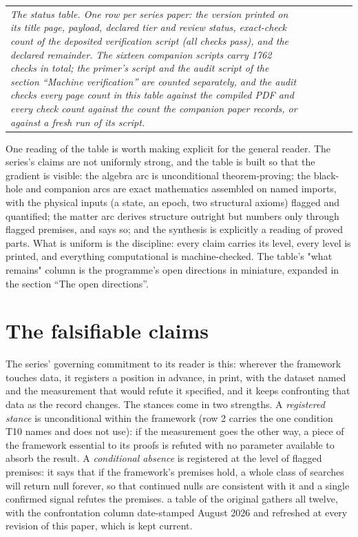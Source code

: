 \documentclass[11pt]{article}
\theoremstyle{definition}
\theoremstyle{plain}
\begin{document}
\begin{longtable}{p{} p{} p{} p{} p{} p{}}
\emph{The status table. One row per series paper: the version printed on its title page, payload, declared tier and review status, exact-check count of the deposited verification script (all checks pass), and the declared remainder. The sixteen companion scripts carry 1762 checks in total; the primer's script and the audit script of the section ``Machine verification'' are counted separately, and the audit checks every page count in this table against the compiled PDF and every check count against the count the companion paper records, or against a fresh run of its script.}

\end{longtable}
 One reading of the table is worth making explicit for the general reader. The series's claims are not uniformly strong, and the table is built so that the gradient is visible: the algebra arc is unconditional theorem-proving; the black-hole and companion arcs are exact mathematics assembled on named imports, with the physical inputs (a state, an epoch, two structural axioms) flagged and quantified; the matter arc derives structure outright but numbers only through flagged premises, and says so; and the synthesis is explicitly a reading of proved parts. What is uniform is the discipline: every claim carries its level, every level is printed, and everything computational is machine-checked. The table's "what remains" column is the programme's open directions in miniature, expanded in the section ``The open directions''.

\section{The falsifiable claims}

\label{c:note.programme.setting-falsifiable-claims}
The series' governing commitment to its reader is this: wherever the framework touches data, it registers a position in advance, in print, with the dataset named and the measurement that would refute it specified, and it keeps confronting that data as the record changes. The stances come in two strengths. A \emph{registered stance} is unconditional within the framework (row 2 carries the one condition T10 names and does not use): if the measurement goes the other way, a piece of the framework essential to its proofs is refuted with no parameter available to absorb the result. A \emph{conditional absence} is registered at the level of flagged premises: it says that if the framework's premises hold, a whole class of searches will return null forever, so that continued nulls are consistent with it and a single confirmed signal refutes the premises. a table of the original gathers all twelve, with the confrontation column date-stamped August 2026 and refreshed at every revision of this paper, which is kept current.
\end{document}
